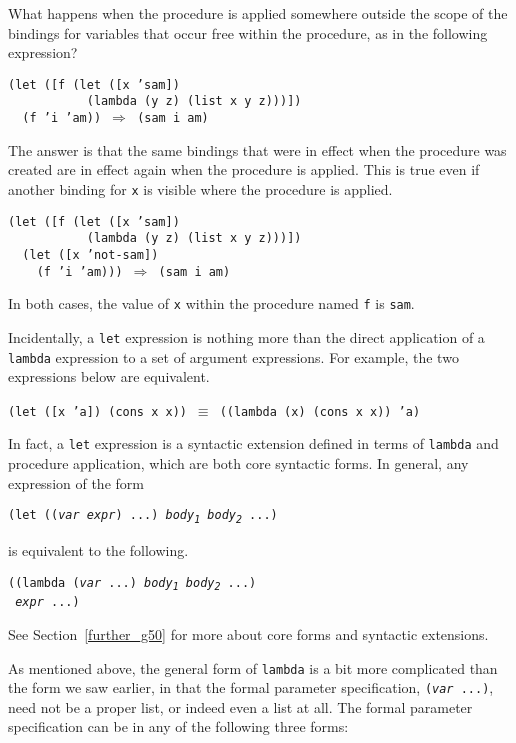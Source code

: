What happens when the procedure is applied somewhere outside
the scope of the bindings for variables that occur free
within the procedure, as in the following expression?


\begin{alltt}
(let ([f (let ([x 'sam])
           (lambda (y z) (list x y z)))])
  (f 'i 'am)) \(\Rightarrow\) (sam i am)
\end{alltt}


The answer is that the same bindings that were in effect when
the procedure was created are in effect again when the procedure
is applied.
This is true even if another binding for \texttt{x}
is visible where the procedure is applied.


\begin{alltt}
(let ([f (let ([x 'sam])
           (lambda (y z) (list x y z)))])
  (let ([x 'not-sam])
    (f 'i 'am))) \(\Rightarrow\) (sam i am)
\end{alltt}


In both cases, the value of \texttt{x} within the procedure named
\texttt{f} is \texttt{sam}.



Incidentally, a \texttt{let} expression is nothing more than the
direct application of a \texttt{lambda} expression to a set of
argument expressions.
For example, the two expressions below are equivalent.


\texttt{(let ([x 'a]) (cons x x))} \(\equiv\) \texttt{((lambda (x) (cons x x)) 'a)}


In fact, a \label{start_s69}\texttt{let} expression is a syntactic extension defined
in terms of \texttt{lambda} and procedure application, which are
both core syntactic forms.
In general, any expression of the form


\texttt{(let ((\textit{var} \textit{expr}) ...) \textit{body\textsubscript{1}} \textit{body\textsubscript{2}} ...)}

is equivalent to the following.


\begin{alltt}
((lambda (\textit{var} ...) \textit{body\textsubscript{1}} \textit{body\textsubscript{2}} ...)
 \textit{expr} ...)
\end{alltt}


See Section \ref{further_g50} for more about core forms and syntactic
extensions.


As mentioned above, the general form of
\label{start_s70}\label{start_s71}\texttt{lambda} is a bit
more complicated than the form we saw earlier, in that the
formal parameter specification, \texttt{(\textit{var} ...)}, need not be a proper list,
or indeed even a list at all.
The formal parameter specification can be in any of the following three forms:

